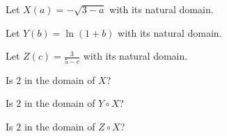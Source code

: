 \documentclass{ximera}
\begin{document}
\begin{example}


Let $X(a) = -\sqrt{3 - a}$ with its natural domain.


Let $Y(b) = \ln(1 + b)$ with its natural domain.


Let $Z(c) = \frac{3}{5 - c}$ with its natural domain.



\begin{question}

Is $2$ in the domain of $X$?

\begin{multipleChoice}
\end{multipleChoice}

\end{question}





\begin{question}

Is $2$ in the domain of $Y \circ X$?

\begin{multipleChoice}
\end{multipleChoice}

\end{question}



\begin{question}

Is $2$ in the domain of $Z \circ X$?

\begin{multipleChoice}
\end{multipleChoice}

\end{question}




\end{example}
\end{document}

